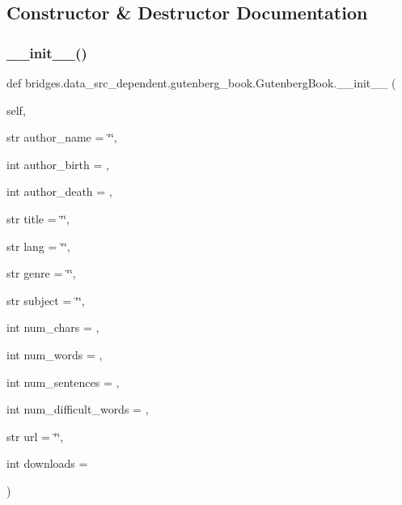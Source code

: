 \subsection{Constructor \& Destructor Documentation}
\mbox{\label{classbridges_1_1data__src__dependent_1_1gutenberg__book_1_1_gutenberg_book_a68f657e8cd43cd02776eca64f68b5872}} 
\subsubsection{\texorpdfstring{\_\_init\_\_()}{\_\_init\_\_()}}
{\footnotesize\ttfamily def bridges.\+data\+\_\+src\+\_\+dependent.\+gutenberg\+\_\+book.\+Gutenberg\+Book.\+\_\+\+\_\+init\+\_\+\+\_\+ (\begin{DoxyParamCaption}\item[{}]{self,  }\item[{str }]{author\+\_\+name = {\ttfamily \char`\"{}\char`\"{}},  }\item[{int }]{author\+\_\+birth = {},  }\item[{int }]{author\+\_\+death = {},  }\item[{str }]{title = {\ttfamily \char`\"{}\char`\"{}},  }\item[{str }]{lang = {\ttfamily \char`\"{}\char`\"{}},  }\item[{str }]{genre = {\ttfamily \char`\"{}\char`\"{}},  }\item[{str }]{subject = {\ttfamily \char`\"{}\char`\"{}},  }\item[{int }]{num\+\_\+chars = {},  }\item[{int }]{num\+\_\+words = {},  }\item[{int }]{num\+\_\+sentences = {},  }\item[{int }]{num\+\_\+difficult\+\_\+words = {},  }\item[{str }]{url = {\ttfamily \char`\"{}\char`\"{}},  }\item[{int }]{downloads = {} }\end{DoxyParamCaption})}



